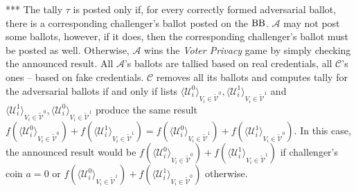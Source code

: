 *** The tally $\tau$ is posted only if, for every correctly formed adversarial ballot, there is a corresponding challenger's ballot posted on the $\operatorname{BB}$. $\mathcal{A}$ may not post some ballots, however, if it does, then the corresponding challenger's ballot must be posted as well. Otherwise, $\mathcal{A}$ wins the \textit{Voter Privacy} game by simply checking the announced result.  All $\mathcal{A}$'s ballots are tallied based on real credentials, all  $\mathcal{C}$'s ones -- based on fake credentials.   $\mathcal{C}$ removes all its ballots and computes tally for the adversarial ballots if and only if  lists $\langle \mathcal{U}^0_i \rangle _{V_i \in \tilde{\mathcal{V}}^0}, \langle \mathcal{U}^1_i \rangle _{V_i \in \tilde{\mathcal{V}}^1}$ and $\langle \mathcal{U}^1_i \rangle _{V_i \in \tilde{\mathcal{V}}^0}, \langle \mathcal{U}^0_i \rangle _{V_i \in \tilde{\mathcal{V}}^1}$ produce the same result $f(\langle \mathcal{U}^0_i \rangle _{V_i \in \tilde{\mathcal{V}}^0} ) + f(\langle \mathcal{U}^1_i \rangle _{V_i \in \tilde{\mathcal{V}}^1} ) =  f(\langle \mathcal{U}^0_i \rangle _{V_i \in \tilde{\mathcal{V}}^1} ) +  f(\langle \mathcal{U}^1_i \rangle _{V_i \in \tilde{\mathcal{V}}^0} )$. In this case, the announced result would be $f(\langle \mathcal{U}^0_i \rangle _{V_i \in \tilde{\mathcal{V}}^0} ) + f(\langle \mathcal{U}^1_i \rangle _{V_i \in \tilde{\mathcal{V}}^1} )$ if challenger's coin $a=0$ or  $f(\langle \mathcal{U}^0_i \rangle _{V_i \in \tilde{\mathcal{V}}^1} ) +  f(\langle \mathcal{U}^1_i \rangle _{V_i \in \tilde{\mathcal{V}}^0} )$ otherwise.\\

